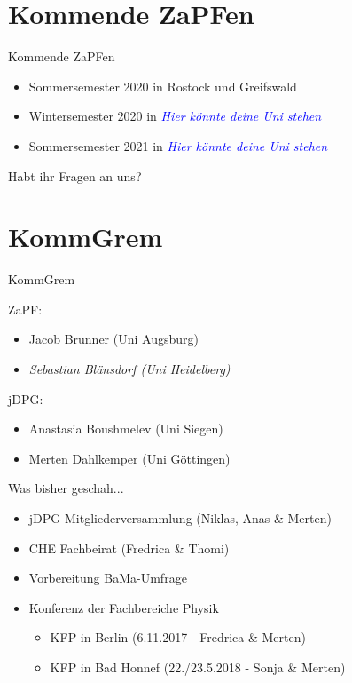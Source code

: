 \documentclass[compress, aspectratio=169]{beamer}
\begin{document}
\section{Kommende ZaPFen}
\begin{frame}{Kommende ZaPFen}
  \begin{itemize}
    \item Sommersemester 2020 in Rostock und Greifswald
    \item Wintersemester 2020 in \textcolor{blue}{\textit{Hier könnte deine Uni stehen}}
    \item Sommersemester 2021 in \textcolor{blue}{\textit{Hier könnte deine Uni stehen}}
    \end{itemize}
\end{frame}

\begin{frame}[plain]
  \begin{center}
    \Huge Habt ihr Fragen an uns?
    \end{center}
\end{frame}

\section{KommGrem}

 \begin{frame}{KommGrem}
  
  ZaPF:
  \begin{itemize}
   \item Jacob Brunner (Uni Augsburg)
   \item \textit{Sebastian Blänsdorf (Uni Heidelberg)}
  \end{itemize}
  
  jDPG:
  \begin{itemize}
   \item Anastasia Boushmelev (Uni Siegen)
   \item Merten Dahlkemper (Uni Göttingen)
  \end{itemize}

 \end{frame}
 

 \begin{frame}{Was bisher geschah...}
  \begin{itemize}
   \item jDPG Mitgliederversammlung (Niklas, Anas \& Merten)
   \item CHE Fachbeirat (Fredrica \& Thomi)
   \item Vorbereitung BaMa-Umfrage
   \item Konferenz der Fachbereiche Physik
   \begin{itemize}
    \item KFP in Berlin (6.11.2017 - Fredrica \& Merten)
    \item KFP in Bad Honnef (22./23.5.2018 - Sonja \& Merten)
   \end{itemize}
  \end{itemize}
 \end{frame}
 
\end{document}
